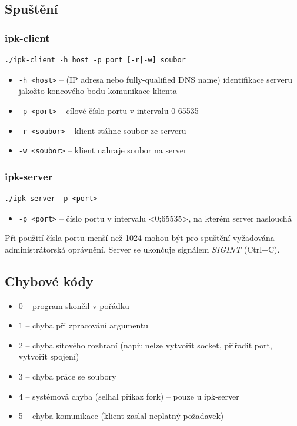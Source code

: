 \documentclass[11pt,a4paper]{article}
\begin{document}
\subsection{Spuštění}
\subsubsection*{ipk-client}
\begin{lstlisting}
./ipk-client -h host -p port [-r|-w] soubor
\end{lstlisting}
\begin{itemize}
	\item \texttt{-h <host>} -- (IP adresa nebo fully-qualified DNS name) identifikace serveru jakožto koncového bodu komunikace klienta
	\item \texttt{-p <port>} -- cílové číslo portu v intervalu 0-65535
	\item \texttt{-r <soubor>} -- klient stáhne soubor ze serveru
	\item \texttt{-w <soubor>} -- klient nahraje soubor na server
\end{itemize}

\subsubsection*{ipk-server}
\begin{lstlisting}
./ipk-server -p <port>
\end{lstlisting}
\begin{itemize}
	\item \texttt{-p <port>} -- číslo portu v intervalu <0;65535>, na kterém server naslouchá
\end{itemize}
Při použití čísla portu menší než 1024 mohou být pro spuštění vyžadována administrátorská oprávnění. Server se ukončuje signálem \textit{SIGINT} (Ctrl+C).

\subsection{Chybové kódy}
\begin{itemize}
	\item 0 -- program skončil v pořádku
	\item 1 -- chyba při zpracování argumentu
	\item 2 -- chyba síťového rozhraní (např: nelze vytvořit socket, přiřadit port, vytvořit spojení)
	\item 3 -- chyba práce se soubory
	\item 4 -- systémová chyba (selhal příkaz fork) -- pouze u ipk-server
	\item 5 -- chyba komunikace (klient zaslal neplatný požadavek)
\end{itemize}
\end{document}
